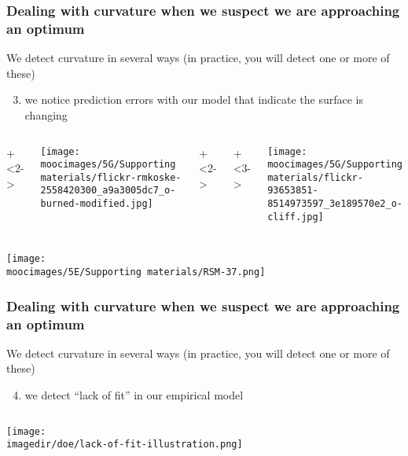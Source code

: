 \documentclass[handout,11pt,aspectratio=169,mathserif]{beamer}
\begin{document}
\begin{frame}\frametitle{Dealing with curvature when we suspect we are approaching an optimum}
	{\color{myOrange}We detect curvature in several ways (in practice, you will detect one or more of these)}
	
	\vspace{.7cm}
	\begin{enumerate}\setcounter{enumi}{2}
		\item	we notice prediction errors with our model that indicate the surface is changing
	\end{enumerate}
	
	
	\vspace{.5cm}
	\begin{columns}[T]
			
			\onslide+<2->{
			
				\centerline{\texttt{[image: \\moocimages/5G/Supporting materials/flickr-rmkoske-2558420300\_a9a3005dc7\_o-burned-modified.jpg]}}
			}
			
		
			\onslide+<2->{
			
				\vspace{.5cm}
				
			
			}
			\onslide+<3->{
				
				\centerline{\texttt{[image: \\moocimages/5G/Supporting materials/flickr-93653851-8514973597\_3e189570e2\_o-cliff.jpg]}}
				\vspace{-1.2cm}
			}
	\end{columns}
	
\end{frame}

\begin{frame}\frametitle{}
	\centerline{\texttt{[image: \\moocimages/5E/Supporting materials/RSM-37.png]}}
\end{frame}

\begin{frame}\frametitle{Dealing with curvature when we suspect we are approaching an optimum}
	{\color{myOrange}We detect curvature in several ways (in practice, you will detect one or more of these)}
	
	\vspace{.7cm}
	\begin{enumerate}\setcounter{enumi}{3}
		\item	we detect ``lack of fit'' in our empirical model
	\end{enumerate}
	
	\begin{columns}[T]

			
			\centerline{\texttt{[image: \\imagedir/doe/lack-of-fit-illustration.png]}}
	\end{columns}
	
\end{frame}
\end{document}
